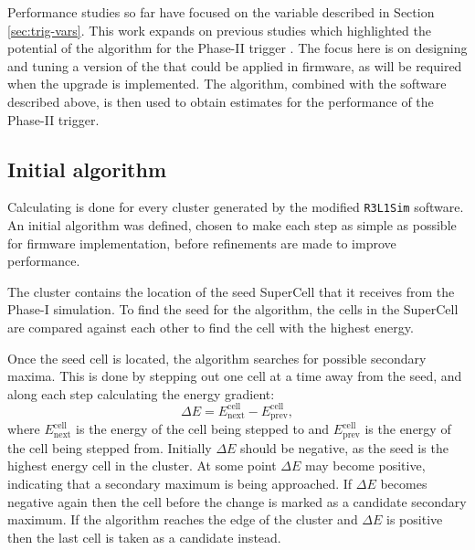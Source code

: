\label{sec:eratio}

Performance studies so far have focused on the \eratio variable described
in Section \ref{sec:trig-vars}.
This work expands on previous studies which highlighted the potential of
the \eratio algorithm for the Phase-II trigger \cite{CERN-LHCC-2017-020}.
The focus here is on designing
and tuning a version of the \eratio that could be applied in firmware, as
will be required when the upgrade is implemented. The algorithm, combined with the
software described above, is then used to obtain estimates for the performance
of the Phase-II \egamma trigger.



\subsection{Initial algorithm}

Calculating \eratio is done for every cluster generated by the modified
\texttt{R3L1Sim} software. An initial algorithm was defined, chosen to make
each step as simple as possible for firmware implementation, before refinements
are made to improve performance.

The cluster contains the location of the seed SuperCell that it receives from
the Phase-I simulation. To find the seed for
the \eratio algorithm, the cells in the SuperCell are compared against each other
to find the cell with the highest energy.

Once the seed cell is located, the algorithm searches for possible secondary maxima.
This is done by stepping out one cell at a time away from the seed, and along each step
calculating the energy gradient:
$$
  \Delta E = E_\mathrm{next}^\mathrm{cell} - E_\mathrm{prev}^\mathrm{cell},
$$
where $E_\mathrm{next}^\mathrm{cell}$ is the energy of the cell being stepped to
and $E_\mathrm{prev}^\mathrm{cell}$ is the energy of the cell being stepped from.
Initially $\Delta E$ should be negative, as the seed is the highest energy cell in
the cluster. At some point $\Delta E$ may become positive, indicating that a secondary
maximum is being approached. If $\Delta E$ becomes negative again then the cell before
the change is marked as a candidate secondary maximum. If the algorithm reaches the edge
of the cluster and $\Delta E$ is positive then the last cell is taken as a candidate
instead.

